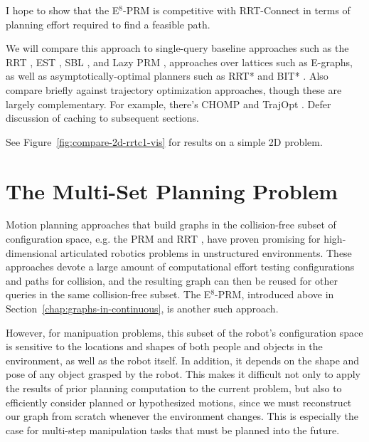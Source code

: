 I hope to show that the E$^8$-PRM is competitive with RRT-Connect
in terms of planning effort required to find a feasible path.

We will compare this approach to
single-query baseline approaches
such as the RRT \citep{kuffner2000rrtconnect},
EST \citep{hsu1997expansive},
SBL \citep{sanchezante2001sbl},
and Lazy PRM \citep{bohlin2000lazyprm},
approaches over lattices such as E-graphs,
as well as asymptotically-optimal planners such as
RRT* \citep{karaman2011samplingoptimal}
and BIT* \citep{gammell2015bitstar}.
Also compare briefly against trajectory optimization approaches,
though these are largely complementary.
For example, there's CHOMP \citep{zucker2013chomp}
and TrajOpt \citep{schulman2013trajopt}.
Defer discussion of caching to subsequent
sections.

See Figure~\ref{fig:compare-2d-rrtc1-vis}
for results on a simple 2D problem.

\clearpage
\section{The Multi-Set Planning Problem}
\label{chap:multi-set}

Motion planning approaches that build graphs
in the collision-free subset of
configuration space,
e.g. the
PRM \citep{kavrakietal1996prm}
and RRT \citep{lavallekuffner1999rrt},
have proven promising
for high-dimensional articulated robotics problems
in unstructured environments.
These approaches devote a large amount of computational effort
testing configurations and paths for collision,
and the resulting graph can then be reused
for other queries in the same collision-free subset.
The E$^8$-PRM,
introduced above in Section~\ref{chap:graphs-in-continuous},
is another such approach.

However,
for manipuation problems,
this subset of the robot's configuration space
is sensitive to the locations and shapes of
both people and objects in the environment,
as well as the robot itself.
In addition, it depends on the shape and pose of any object
grasped by the robot.
This makes it difficult not only to apply the results of prior
planning computation to the current problem,
but also to efficiently consider planned or hypothesized motions,
since we must reconstruct our graph from scratch whenever
the environment changes.
This is especially the case for
multi-step manipulation tasks that must be planned into the future.

